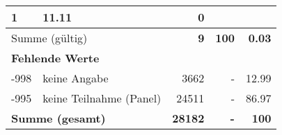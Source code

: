 \begin{longtable}{lXrrr}
       \num{1} &
       \num[round-mode=places,round-precision=2]{11.11} &
         \num[round-mode=places,round-precision=2]{0} \\
     \midrule
     \multicolumn{2}{l}{Summe (gültig)} &
       \textbf{\num{9}} &
     \textbf{100} &
       \textbf{\num[round-mode=places,round-precision=2]{0.03}} \\
     \multicolumn{5}{l}{\textbf{Fehlende Werte}}\\
       -998 &
       keine Angabe &
         \num{3662} &
        - &
         \num[round-mode=places,round-precision=2]{12.99} \\
       -995 &
       keine Teilnahme (Panel) &
         \num{24511} &
        - &
         \num[round-mode=places,round-precision=2]{86.97} \\
     \midrule
     \multicolumn{2}{l}{\textbf{Summe (gesamt)}} &
          \textbf{\num{28182}} &
        \textbf{-} &
        \textbf{100} \\
     \bottomrule
     \end{longtable}
     
